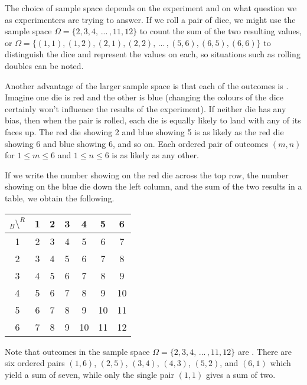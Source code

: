 \par
The choice of sample space depends on the experiment and on what question we as experimenters are trying to answer. If we roll a pair of dice, we might use the sample space $\Omega = \{2,3,4,\,...\,,11,12\}$ to count the sum of the two resulting values, or $\Omega = \{(1,1),(1,2),(2,1),(2,2),\,...\,,(5,6),(6,5),(6,6)\}$ to distinguish the dice and represent the values on each, so situations such as rolling doubles can be noted.
\par
Another advantage of the larger sample space is that each of the outcomes is . Imagine one die is red and the other is blue (changing the colours of the dice certainly won't influence the results of the experiment). If neither die has any bias, then when the pair is rolled, each die is equally likely to land with any of its faces up. The red die showing 2 and blue showing 5 is as likely as the red die showing 6 and blue showing 6, and so on. Each ordered pair of outcomes $(m,n)$ for $1 \leq m \leq 6$ and $1 \leq n \leq 6$ is as likely as any other.
\par
If we write the number showing on the red die across the top row, the number showing on the blue die down the left column, and the sum of the two results in a table, we obtain the following.
{\small
\begin{center}
\begin{tabular}{c|cccccc}
$_{B} \setminus ^R$ & 1 & 2 & 3 & 4 & 5 & 6 \\
\hline
1 & 2 & 3 & 4 & 5 & 6 & 7 \\
2 & 3 & 4 & 5 & 6 & 7 & 8 \\
3 & 4 & 5 & 6 & 7 & 8 & 9 \\
4 & 5 & 6 & 7 & 8 & 9 & $\!$10 \\
5 & 6 & 7 & 8 & 9 & $\!$10 & $\!$11 \\
6 & 7 & 8 & 9 & $\!$10 & $\!$11 & $\!$12 \\
\end{tabular}
\end{center}
}
Note that outcomes in the sample space $\Omega = \{2,3,4,\,...\,,11,12\}$ are . There are six ordered pairs $(1,6)$, $(2,5)$, $(3,4)$, $(4,3)$, $(5,2)$, and $(6,1)$ which yield a sum of seven, while only the single pair $(1,1)$ gives a sum of two.
